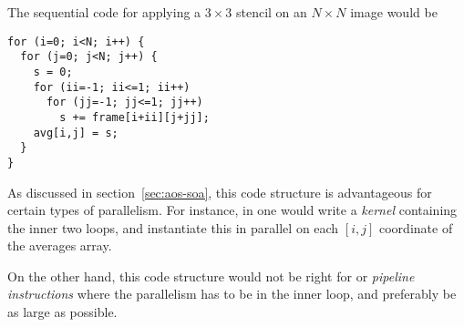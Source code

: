 The sequential code for applying a $3\times 3$ stencil
on an $N\times N$ image
would be
\begin{verbatim}
for (i=0; i<N; i++) {
  for (j=0; j<N; j++) {
    s = 0;
    for (ii=-1; ii<=1; ii++)
      for (jj=-1; jj<=1; jj++)
        s += frame[i+ii][j+jj];
    avg[i,j] = s;
  }
}
\end{verbatim}

As discussed in section~\ref{sec:aos-soa}, this code structure
is advantageous for certain types of parallelism. For instance,
in  one would write a \emph{kernel}
containing the inner two loops, and instantiate this
in parallel on each $[i,j]$ coordinate of the averages array.

On the other hand, this code structure would not be right for
 or \emph{pipeline
  instructions} where the parallelism has
to be in the inner loop, and preferably be as large as possible.

